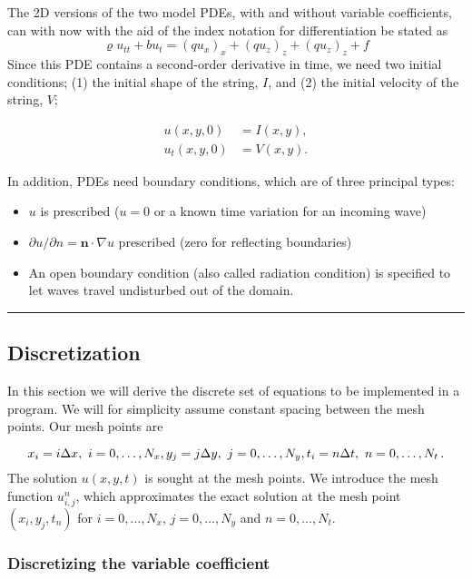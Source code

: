 \documentclass[letterpaper,10pt,english]{/usr/share/sphinx/texinputs/sphinxhowto}
\begin{document}
The 2D versions of the two model PDEs, with and without variable
coefficients, can with now with the aid of the index notation for
differentiation be stated as \[
\varrho u_{tt} + b u_{t}= (q u_x)_x + (q u_z)_z + (q u_z)_z + f
\] Since this PDE contains a second-order derivative in time, we need
two initial conditions; (1) the initial shape of the string, $I$, and
(2) the initial velocity of the string, $V$;

\begin{align*}
u(x,y,0)&=I(x,y),\\
u_t(x,y,0)&=V(x,y).
\end{align*}

In addition, PDEs need boundary conditions, which are of three principal
types:

\begin{itemize}
\itemsep1pt\parskip0pt
\item
  $u$ is prescribed ($u=0$ or a known time variation for an incoming
  wave)
\item
  $\partial u/\partial n = \boldsymbol{n}\cdot\nabla u$ prescribed (zero
  for reflecting boundaries)
\item
  An open boundary condition (also called radiation condition) is
  specified to let waves travel undisturbed out of the domain.
\end{itemize}\begin{center}\rule{3in}{0.4pt}\end{center}

\subsection{Discretization}

In this section we will derive the discrete set of equations to be
implemented in a program. We will for simplicity assume constant spacing
between the mesh points. Our mesh points are

\[
x_i = i\Delta x,\ i=0,\ldots,N_x,\quad \\ 
y_j = j\Delta y,\ j=0,\ldots,N_y,\quad \\
t_i = n\Delta t,\ n=0,\ldots,N_t{\thinspace .}
\] The solution $u(x,y,t)$ is sought at the mesh points. We introduce
the mesh function $u_{i,j}^n$, which approximates the exact solution at
the mesh point $(x_i,y_j,t_n)$ for $i=0,\ldots,N_x$, $j=0,\ldots,N_y$
and $n=0,\ldots,N_t$.\subsubsection{Discretizing the variable coefficient}
\end{document}
